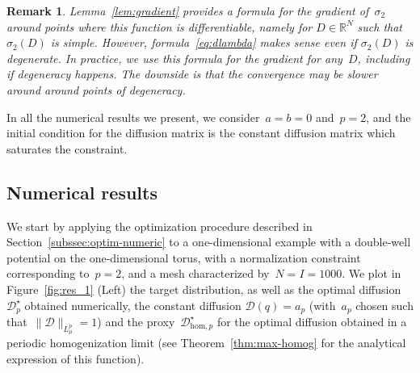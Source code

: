 \documentclass{article}
\newtheorem{remark}{Remark}
\newcommand{\R}{\mathbb{R}}
\def\R{\mathbb{R}}
\newcommand{\Diff}{\mathcal{D}}
\newcommand{\diff}{D}
\begin{document}
\begin{remark}
  Lemma~\ref{lem:gradient} provides a formula for the gradient of~$\sigma_2$ around points where this function is differentiable, namely for $\diff \in\R^N$ such that $\sigma_2(\diff)$ is simple. However, formula~\eqref{eq:dlambda} makes sense even if $\sigma_2(\diff)$ is degenerate. In practice, we use this formula for the gradient for any~$\diff$, including if degeneracy happens. The downside is that the convergence may be slower around around points of degeneracy.
\end{remark}

In all the numerical results we present, we consider~$a=b=0$ and~$p=2$, and the initial condition for the diffusion matrix is the constant diffusion matrix which saturates the constraint.

\subsection{Numerical results}
\label{subsec:numerical-optim}


We start by applying the optimization procedure described in Section~\ref{subssec:optim-numeric} to a one-dimensional example with a double-well potential on the one-dimensional torus, with a normalization constraint corresponding to~$p=2$, and a mesh characterized by~$N = I = 1000$. We plot in Figure~\ref{fig:res_1} (Left) the target distribution, as well as the optimal diffusion~$\Diff^{\star}_p$ obtained numerically, the constant diffusion $\Diff(q)=a_p$ (with~$a_p$ chosen such that~$\|\Diff\|_{L^p_\mu} = 1$) and the proxy~$\Diff_{\mathrm{hom},p}^\star$ for the optimal diffusion obtained in a periodic homogenization limit (see Theorem~\ref{thm:max-homog} for the analytical expression of this function).
\end{document}
